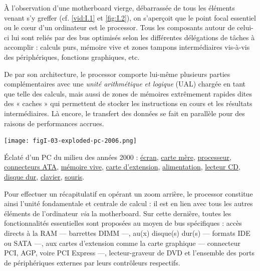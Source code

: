 À l'observation d'une \gls{motherboard} vierge, débarrassée de tous les éléments venant s'y greffer (cf. \cref{vid:I.1} et \cref{fig:I.2}), on s'aperçoit que le point focal essentiel ou le cœur d'un ordinateur est le \gls{processor}. Tous les composants autour de celui-ci lui sont reliés par des bus optimisés selon les différentes délégations de tâches à accomplir : calculs purs, mémoire vive et zones tampons intermédiaires vis-à-vis des périphériques, fonctions graphiques, etc.

De par son architecture, le \gls{processor} comporte lui-même plusieurs parties complémentaires avec une \emph{unité arithmétique et logique} (UAL) chargée en tant que telle des calculs, mais aussi de zones de mémoires extrêmement rapides dites des « caches » qui permettent de stocker les instructions en cours et les résultats intermédiaires. Là encore, le transfert des données se fait en parallèle pour des raisons de performances accrues.


\begin{marginfigure}%
	\texttt{[image: figI-03-exploded-pc-2006.png]}
\caption{\label{fig:I.3}Éclaté d'un PC du milieu des années 2000 : 
\href{https://fr.wikipedia.org/wiki/\%C3\%89cran_d\%27ordinateur}{écran}, 
\href{https://fr.wikipedia.org/wiki/Carte_m\%C3\%A8re}{carte mère}, 
\href{https://fr.wikipedia.org/wiki/Processeur}{processeur}, 
\href{https://fr.wikipedia.org/wiki/Parallel_ATA}{connecteurs ATA}, 
\href{https://fr.wikipedia.org/wiki/M\%C3\%A9moire_vive}{mémoire vive}, 
\href{https://fr.wikipedia.org/wiki/Carte_d\%27extension}{carte d'extension}, 
\href{https://fr.wikipedia.org/wiki/Alimentation_\%C3\%A9lectrique}{alimentation}, 
\href{https://fr.wikipedia.org/wiki/Lecteur_de_CD}{lecteur CD}, 
\href{https://fr.wikipedia.org/wiki/Disque_dur}{disque dur}, 
\href{https://fr.wikipedia.org/wiki/Clavier_d\%27ordinateur}{clavier}, 
\href{https://fr.wikipedia.org/wiki/Souris_\%28informatique\%29}{souris}.}
\end{marginfigure}
Pour effectuer un récapitulatif en opérant un zoom arrière, le \gls{processor} constitue ainsi l'unité fondamentale et centrale de calcul : il est en lien avec tous les autres éléments de l’ordinateur \textit{via} la \gls{motherboard}. Sur cette dernière, toutes les fonctionnalités essentielles sont proposées au moyen de bus spécifiques : accès directs à la \gls{RAM} --- barrettes DIMM ---, au(x) disque(s) dur(s) --- formats IDE ou SATA ---, aux cartes d'extension comme la carte graphique --- connecteur PCI, AGP, voire PCI Express ---, lecteur-graveur de DVD et l'ensemble des ports de périphériques externes par leurs contrôleurs respectifs.

